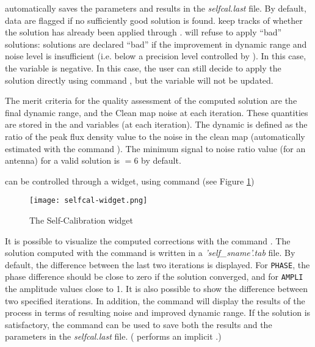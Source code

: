  automatically saves the parameters and results in 
the \textit{selfcal.last} file. By default, data are flagged if no 
sufficiently good solution is found.  keep tracks 
of whether the solution has already been applied through 
.  will refuse to apply 
``bad'' solutions: solutions are declared ``bad'' if the improvement in 
dynamic range and noise level is insufficient (i.e. below a precision 
level controlled by ). In this case, the 
 variable is negative. In this case, the user can 
still decide to apply the solution directly using command , 
but the  variable will not be updated.

The merit criteria for the quality assessment of the computed solution 
are the final dynamic range, and the Clean map noise at each iteration. 
These quantities are stored in the  and 
 variables (at each iteration). The dynamic is 
defined as the ratio of the peak flux density value to the noise in the 
clean map (automatically estimated with the command ). 
The  minimum signal to noise ratio value (for an antenna) for a valid 
solution is $=6$ by default. 

 can be controlled through a widget, using
command  (see Figure \ref{fig:selfcal}) 
\begin{figure}
  \centering
  \texttt{[image: selfcal-widget.png]}
  \caption{The Self-Calibration widget
\label{fig:selfcal}}
\end{figure}


It is possible to visualize the computed corrections with the command 
. The solution computed with the  
command is written in a \textit{'self\_sname'.tab} file. By default, 
the difference between the last two iterations is displayed. For 
\texttt{PHASE}, the phase difference should be close to zero if the 
solution converged, and for \texttt{AMPLI} the amplitude values close 
to 1. It is also possible to show the difference between two specified 
iterations. In addition, the command  will 
display the results of the process in terms of resulting noise and 
improved dynamic range. If the solution is satisfactory, the command 
 can be used to save both the results and the 
parameters in the \textit{selfcal.last} file. ( 
performs an implicit .)


